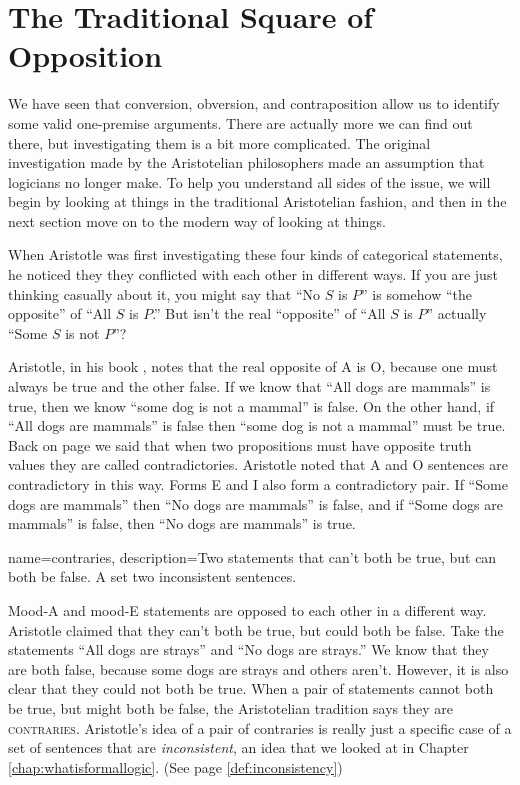 
\section{The Traditional Square of Opposition}

We have seen that conversion, obversion, and contraposition allow us to identify some valid one-premise arguments. There are actually more we can find out there, but investigating them is a bit more complicated. The original investigation made by the Aristotelian philosophers made an assumption that logicians no longer make.  To help you understand all sides of the issue, we will begin by looking at things in the traditional Aristotelian fashion, and then in the next section move on to the modern way of looking at things.

When Aristotle was first investigating these four kinds of categorical statements, he noticed they they conflicted with each other in different ways. If you are just thinking casually about it, you might say that ``No $S$ is $P$'' is somehow ``the opposite'' of ``All $S$ is $P$.'' But isn't the real ``opposite'' of ``All $S$ is $P$'' actually ``Some $S$ is not $P$''?

Aristotle, in his book \cite{Aristotle:interpretation}, notes that the real opposite of A is O, because one must always be true and the other false.  If we know that ``All dogs are mammals'' is true, then we know ``some dog is not a mammal'' is false. On the other hand, if ``All dogs are mammals'' is false then ``some dog is not a mammal'' must be true. Back on page \pageref{def:contradictory} we said that when two propositions must have opposite truth values they are called contradictories. Aristotle noted that A and O sentences are contradictory in this way. Forms E and I also form a contradictory pair. If ``Some dogs are mammals'' then ``No dogs are mammals'' is false, and if ``Some dogs are mammals'' is false, then ``No dogs are mammals'' is true.


{
name=contraries,
description={Two statements that can't both be true, but can both be false. A set two inconsistent sentences.}
}


Mood-A and mood-E statements are opposed to each other in a different way. Aristotle claimed that they can't both be true, but could both be false. Take the statements ``All dogs are strays'' and ``No dogs are strays.'' We know that they are both false, because some dogs are strays and others aren't. However, it is also clear that they could not both be true. When a pair of statements cannot both be true, but might both be false, the Aristotelian tradition says they are \textsc{\gls{contraries}}. \label{def:Contraries} Aristotle's idea of a pair of contraries is really just a specific case of a set of sentences that are \emph{inconsistent}, an idea that we looked at in Chapter \ref{chap:whatisformallogic}. (See page \ref{def:inconsistency})

